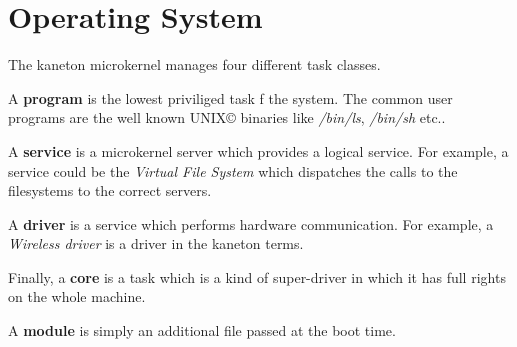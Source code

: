 %
%

\section{Operating System}

The kaneton microkernel manages four different task classes.

A \textbf{program} is the lowest priviliged task f the system. The common
user programs are the well known UNIX{\copyright} binaries like
\textit{/bin/ls}, \textit{/bin/sh} etc..

A \textbf{service} is a microkernel server which provides a logical
service. For example, a service could be the \textit{Virtual File System}
which dispatches the calls to the filesystems to the correct servers.

A \textbf{driver} is a service which performs hardware communication.
For example, a \textit{Wireless driver} is a driver in the kaneton terms.

Finally, a \textbf{core} is a task which is a kind of super-driver in which
it has full rights on the whole machine.

A \textbf{module} is simply an additional file passed at the boot time.
